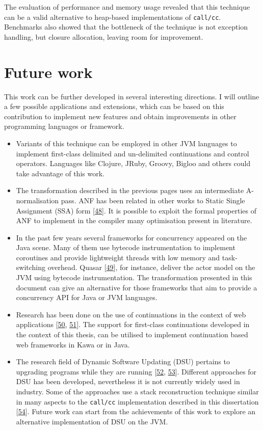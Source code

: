 \documentclass[12pt,a4paper,oneside,openright]{book}
\begin{document}
The evaluation of performance and memory usage revealed that this
technique can be a valid alternative to heap-based implementations of
\texttt{call/cc}. Benchmarks also showed that the bottleneck of the
technique is not exception handling, but closure allocation, leaving
room for improvement.

\section{Future work}\label{future-work}

This work can be further developed in several interesting directions. I
will outline a few possible applications and extensions, which can be
based on this contribution to implement new features and obtain
improvements in other programming languages or framework.

\begin{itemize}
\item
  Variants of this technique can be employed in other JVM languages to
  implement first-class delimited and un-delimited continuations and
  control operators. Languages like Clojure, JRuby, Groovy, Bigloo and
  others could take advantage of this work.
\item
  The transformation described in the previous pages uses an
  intermediate A-normalisation pass. ANF has been related in other works
  to Static Single Assignment (SSA) form
  {[}\hyperref[ref-Chakravarty2004]{48}{]}. It is possible to exploit
  the formal properties of ANF to implement in the compiler many
  optimisation present in literature.
\item
  In the past few years several frameworks for concurrency appeared on
  the Java scene. Many of them use bytecode instrumentation to implement
  coroutines and provide lightweight threads with low memory and
  task-switching overhead. Quasar
  {[}\hyperref[ref-QuasarAkka2015]{49}{]}, for instance, deliver the
  actor model on the JVM using bytecode instrumentation. The
  transformation presented in this document can give an alternative for
  those frameworks that aim to provide a concurrency API for Java or JVM
  languages.
\item
  Research has been done on the use of continuations in the context of
  web applications {[}\hyperref[ref-Matthews2004]{50},
  \hyperref[ref-Queinnec2004]{51}{]}. The support for first-class
  continuations developed in the context of this thesis, can be utilised
  to implement continuation based web frameworks in Kawa or in Java.
\item
  The research field of Dynamic Software Updating (DSU) pertains to
  upgrading programs while they are running
  {[}\hyperref[ref-gregersen2014state]{52},
  \hyperref[ref-Makris2009]{53}{]}. Different approaches for DSU has
  been developed, nevertheless it is not currently widely used in
  industry. Some of the approaches use a stack reconstruction technique
  similar in many aspects to the \texttt{call/cc} implementation
  described in this dissertation {[}\hyperref[ref-Buisson2008]{54}{]}.
  Future work can start from the achievements of this work to explore an
  alternative implementation of DSU on the JVM.
\end{itemize}
\end{document}
